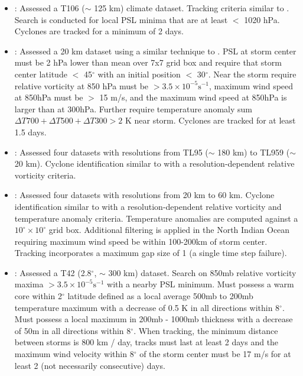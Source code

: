 \documentclass[gmdd, hvmath, online]{copernicus_discussions}
\begin{document}
\begin{itemize}
\item \cite{sugi2002influence}:  Assessed a T106 ($\sim$ 125 km) climate dataset.  Tracking criteria similar to \cite{bengtsson1995hurricane}.  Search is conducted for local PSL minima that are at least $<$ 1020 hPa.  Cyclones are tracked for a minimum of 2 days.

\item \cite{oouchi2006tropical}:  Assessed a 20 km dataset using a similar technique to \cite{sugi2002influence}.  PSL at storm center must be 2 hPa lower than mean over 7x7 grid box and require that storm center latitude $<$ 45$^\circ$ with an initial position $<$ 30$^\circ$.  Near the storm require relative vorticity at 850 hPa must be $> 3.5 \times 10^{-5} \mbox{s}^{-1}$, maximum wind speed at 850hPa must be $>$ 15 m/s, and the maximum wind speed at 850hPa is larger than at 300hPa.  Further require temperature anomaly sum $\Delta T700+ \Delta T500+ \Delta T300 > 2$ K near storm.  Cyclones are tracked for at least 1.5 days.

\item \cite{murakami2010effect}:  Assessed four datasets with resolutions from TL95 ($\sim$ 180 km) to TL959 ($\sim$ 20 km).  Cyclone identification similar to \cite{oouchi2006tropical} with a resolution-dependent relative vorticity criteria.

\item \cite{murakami2012future}:  Assessed four datasets with resolutions from 20 km to 60 km.  Cyclone identification similar to \cite{oouchi2006tropical} with a resolution-dependent relative vorticity and temperature anomaly criteria.  Temperature anomalies are computed against a $10^\circ \times 10^\circ$ grid box.  Additional filtering is applied in the North Indian Ocean requiring maximum wind speed be within 100-200km of storm center.  Tracking incorporates a maximum gap size of 1 (a single time step failure).

\item \cite{vitart1997simulation, vitart1999impact, vitart2001sensitivity}:  Assessed a T42 (2.8$^\circ$, $\sim$ 300 km) dataset.  Search on 850mb relative vorticity maxima $> 3.5 \times 10^{-5} \mbox{s}^{-1}$ with a nearby PSL minimum.  Must possess a warm core within 2$^\circ$ latitude defined as a local average 500mb to 200mb temperature maximum with a decrease of 0.5 K in all directions within 8$^\circ$.  Must possess a local maximum in 200mb - 1000mb thickness with a decrease of 50m in all directions within 8$^\circ$.  When tracking, the minimum distance between storms is 800 km / day, tracks must last at least 2 days and the maximum wind velocity within 8$^\circ$ of the storm center must be 17 m/s for at least 2 (not necessarily consecutive) days.


\end{itemize}
\end{document}
